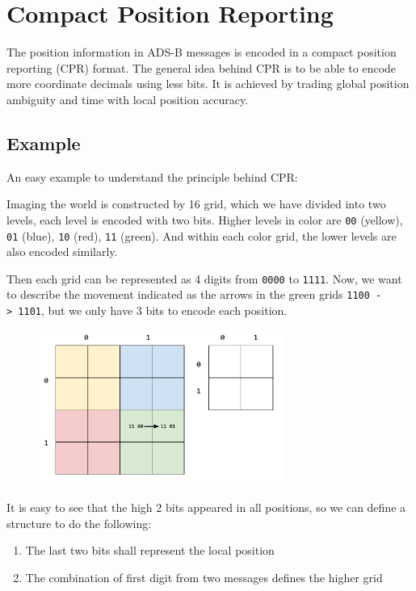 \section{Compact Position Reporting}\label{compact-position-reporting}

The position information in ADS-B messages is encoded in a compact position reporting (CPR) format. The general idea behind CPR is to be able to encode more coordinate decimals using less bits. It is achieved by trading global position ambiguity and time with local position accuracy.

\subsection{Example}\label{example}

An easy example to understand the principle behind CPR:

Imaging the world is constructed by 16 grid, which we have divided into two levels, each level is encoded with two bits. Higher levels in color are \texttt{00} (yellow), \texttt{01} (blue), \texttt{10} (red), \texttt{11} (green). And within each color grid, the lower levels are also encoded similarly.

Then each grid can be represented as 4 digits from \texttt{0000} to \texttt{1111}. Now, we want to describe the movement indicated as the arrows in the green grids \texttt{1100\ -\textgreater{}\ 1101}, but we only have 3 bits to encode each position.

\begin{figure}
  \center
  \includegraphics[width=8cm]{images/illustration-cpr-1.pdf}
\end{figure}

It is easy to see that the high 2 bits appeared in all positions, so we can define a structure to do the following:

\begin{enumerate}
  \item The last two bits shall represent the local position
  \item The combination of first digit from two messages defines the higher grid
\end{enumerate}

